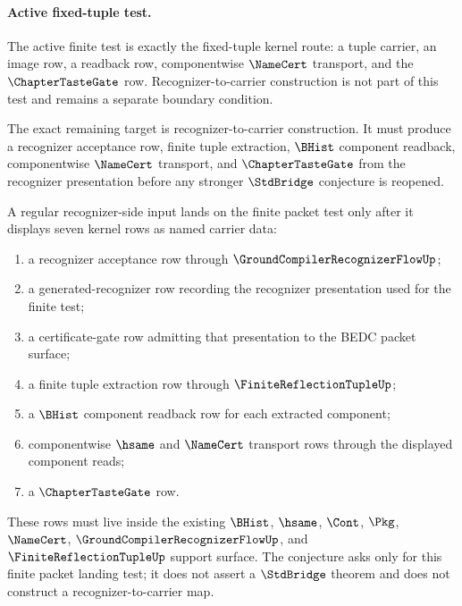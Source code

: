 \paragraph{Active fixed-tuple test.}
The active finite test is exactly the fixed-tuple kernel route: a tuple carrier, an image row, a readback row, componentwise $\NameCert$ transport, and the $\ChapterTasteGate$ row. Recognizer-to-carrier construction is not part of this test and remains a separate boundary condition.

The exact remaining target is recognizer-to-carrier construction. It must produce a recognizer acceptance row, finite tuple extraction, $\BHist$ component readback, componentwise $\NameCert$ transport, and $\ChapterTasteGate$ from the recognizer presentation before any stronger $\StdBridge$ conjecture is reopened.

\begin{conjecture}
\label{conj:finite-bhist-injection-recognizer-to-carrier}
A regular recognizer-side input lands on the finite packet test only after it displays seven kernel rows as named carrier data:
\begin{enumerate}
  \item a recognizer acceptance row through $\GroundCompilerRecognizerFlowUp$;
  \item a generated-recognizer row recording the recognizer presentation used for the finite test;
  \item a certificate-gate row admitting that presentation to the BEDC packet surface;
  \item a finite tuple extraction row through $\FiniteReflectionTupleUp$;
  \item a $\BHist$ component readback row for each extracted component;
  \item componentwise $\hsame$ and $\NameCert$ transport rows through the displayed component reads;
  \item a $\ChapterTasteGate$ row.
\end{enumerate}
These rows must live inside the existing $\BHist$, $\hsame$, $\Cont$, $\Pkg$, $\NameCert$, $\GroundCompilerRecognizerFlowUp$, and $\FiniteReflectionTupleUp$ support surface. The conjecture asks only for this finite packet landing test; it does not assert a $\StdBridge$ theorem and does not construct a recognizer-to-carrier map.
\end{conjecture}


